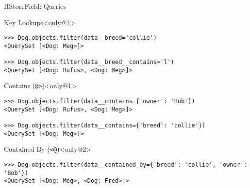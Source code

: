 \begin{frame}[fragile]{HStoreField: Queries}
    \begin{block}{Key Lookups}<only@1>
        \begin{verbatim}
>>> Dog.objects.filter(data__breed='collie')
<QuerySet [<Dog: Meg>]>

>>> Dog.objects.filter(data__breed__contains='l')
<QuerySet [<Dog: Rufus>, <Dog: Meg>]>
        \end{verbatim}
    \end{block}
    \begin{block}{Contains (\texttt{@}\texttt{>})}<only@1>
        \begin{verbatim}
>>> Dog.objects.filter(data__contains={'owner': 'Bob'})
<QuerySet [<Dog: Rufus>, <Dog: Meg>]>

>>> Dog.objects.filter(data__contains={'breed': 'collie'})
<QuerySet [<Dog: Meg>]>
        \end{verbatim}
    \end{block}
    \begin{block}{Contained By (\texttt{<}\texttt{@})}<only@2>
        \begin{verbatim}
>>> Dog.objects.filter(data__contained_by={'breed': 'collie', 'owner': 'Bob'})
<QuerySet [<Dog: Meg>, <Dog: Fred>]>


\end{verbatim}
\end{block}
\end{frame}
